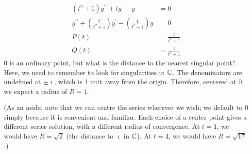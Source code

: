 \documentclass[fleqn,letterpaper]{report}
\begin{document}
\begin{example}
\begin{align*}
(t^2+1)y^{\prime \prime} + ty^\prime - y & = 0 \\
y^{\prime \prime} + \left( \frac{t}{t^2+1} \right) y^{\prime} -
\left( \frac{1}{t^2+1} \right) y & = 0 \\
P(t) & = \frac{t}{t^2+1} \\
Q(t) & = \frac{1}{t^2+1} 
\end{align*}
$0$ is an ordinary point, but what is the distance to the
nearest singular point? Here, we need to remember to look for
singularities in $\mathbb{C}$. The denominators are undefined at
$\pm \imath$, which is 1 unit away from the origin.
Therefore, centered at $0$, we expect a radius of $R=1$.

(As an aside, note that we can centre the series wherever we wish; we
default to $0$ simply because it is convenient and familiar.
Each choice of a center point gives a different series solution, with a
different radius of convergence. At $t=1$, we would have $R=
\sqrt{2}$ (the distance to $\imath$ in $\mathbb{C}$). At $t=4$, we
would have $R = \sqrt{17}$.)


\end{example}
\end{document}
